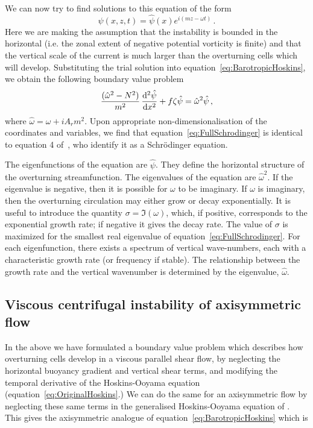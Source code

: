 We can now try to find solutions to this equation of the form
\begin{equation}
    \psi(x, z, t) = \hat{\psi}(x)e^{i(mz - \omega t)} \,.
\end{equation}
Here we are making the assumption that the instability is bounded in the horizontal (i.e. the zonal extent of negative potential vorticity is finite) and that the vertical scale of the current is much larger than the overturning cells which will develop. Substituting the trial solution into equation~\ref{eq:BarotropicHoskins}, we obtain the following boundary value problem
\begin{equation}
    \frac{(\hat{\omega}^2 - N^2 )}{m^2}\, \dv[2]{\hat{\psi}}{x} + f \zeta \hat{\psi} = \hat{\omega}^2 \hat{\psi}\, ,
    \label{eq:FullSchrodinger}
\end{equation}
where $\hat{\omega} = \omega + i A_r m^2$. Upon appropriate non-dimensionalisation of the coordinates and variables, we find that equation~\ref{eq:FullSchrodinger} is identical to equation 4 of~\citet{Plougonven2009}, who identify it as a Schr\"odinger equation.

The eigenfunctions of the equation are $\hat{\psi}$. They define the horizontal structure of the overturning streamfunction. The eigenvalues of the equation are $\hat{\omega}^2$. If the eigenvalue is negative, then it is possible for $\omega$ to be imaginary. If $\omega$ is imaginary, then the overturning circulation may either grow or decay exponentially. It is useful to introduce the quantity $\sigma = \Im(\omega)$, which, if positive, corresponds to the exponential growth rate; if negative it gives the decay rate. The value of $\sigma$ is maximized for the smallest real eigenvalue of equation~\ref{eq:FullSchrodinger}. For each eigenfunction, there exists a spectrum of vertical wave-numbers, each with a characteristic growth rate (or frequency if stable). The relationship between the growth rate and the vertical wavenumber is determined by the eigenvalue, $\hat{\omega}$.

\subsection{Viscous centrifugal instability of axisymmetric flow}
In the above we have formulated a boundary value problem which describes how overturning cells develop in a viscous parallel shear flow, by neglecting the horizontal buoyancy gradient and vertical shear terms, and modifying the temporal derivative of the Hoskins-Ooyama equation (equation~\ref{eq:OriginalHoskins}.) We can do the same for an axisymmetric flow by neglecting these same terms in the generalised Hoskins-Ooyama equation of \citet{Buckingham2021}. This gives the axisymmetric analogue of equation~\ref{eq:BarotropicHoskins} which is

